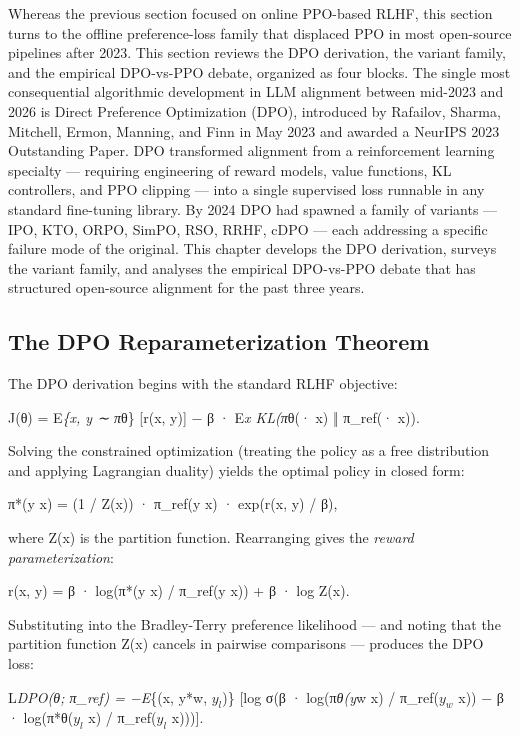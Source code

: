 Whereas the previous section focused on online PPO-based RLHF, this section turns to the offline preference-loss family that displaced PPO in most open-source pipelines after 2023. This section reviews the DPO derivation, the variant family, and the empirical DPO-vs-PPO debate, organized as four blocks. The single most consequential algorithmic development in LLM alignment between mid-2023 and 2026 is Direct Preference Optimization (DPO), introduced by Rafailov, Sharma, Mitchell, Ermon, Manning, and Finn in May 2023 and awarded a NeurIPS 2023 Outstanding Paper. DPO transformed alignment from a reinforcement learning specialty --- requiring engineering of reward models, value functions, KL controllers, and PPO clipping --- into a single supervised loss runnable in any standard fine-tuning library. By 2024 DPO had spawned a family of variants --- IPO, KTO, ORPO, SimPO, RSO, RRHF, cDPO --- each addressing a specific failure mode of the original. This chapter develops the DPO derivation, surveys the variant family, and analyses the empirical DPO-vs-PPO debate that has structured open-source alignment for the past three years.

\subsection{The DPO Reparameterization Theorem}\label{the-dpo-reparameterization-theorem}

The DPO derivation begins with the standard RLHF objective:

J(θ) = E\emph{\{x, y ∼ π}θ\} {[}r(x, y){]} − β · E\emph{x KL(π}θ(· \textbar{} x) ‖ π\_ref(· \textbar{} x)).

Solving the constrained optimization (treating the policy as a free distribution and applying Lagrangian duality) yields the optimal policy in closed form:

π*(y \textbar{} x) = (1 / Z(x)) · π\_ref(y \textbar{} x) · exp(r(x, y) / β),

where Z(x) is the partition function. Rearranging gives the \emph{reward parameterization}:

r(x, y) = β · log(π*(y \textbar{} x) / π\_ref(y \textbar{} x)) + β · log Z(x).

Substituting into the Bradley-Terry preference likelihood --- and noting that the partition function Z(x) cancels in pairwise comparisons --- produces the DPO loss:

L\emph{DPO(θ; π\_ref) = −E}\{(x, y*w, \(y_l\))\} {[}log σ(β · log(π\emph{θ(y}w \textbar{} x) / π\_ref(\(y_w\) \textbar{} x)) − β · log(π*θ(\(y_l\) \textbar{} x) / π\_ref(\(y_l\) \textbar{} x))){]}.

